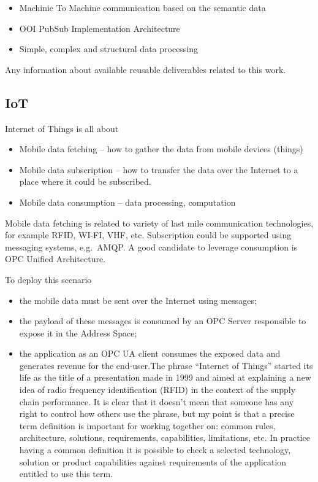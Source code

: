 \documentclass[
]{article}
\providecommand{\tightlist}{%
  \setlength{\itemsep}{0pt}\setlength{\parskip}{0pt}}
\begin{document}
\begin{itemize}
\tightlist
\item
  Machinie To Machine communication based on the semantic data
\item
  OOI PubSub Implementation Architecture
\item
  Simple, complex and structural data processing
\end{itemize}

Any information about available reusable deliverables related to this
work.

\hypertarget{iot}{%
\subsection{IoT}\label{iot}}

Internet of Things is all about

\begin{itemize}
\tightlist
\item
  Mobile data fetching -- how to gather the data from mobile devices
  (things)
\item
  Mobile data subscription -- how to transfer the data over the Internet
  to a place where it could be subscribed.
\item
  Mobile data consumption -- data processing, computation
\end{itemize}

Mobile data fetching is related to variety of last mile communication
technologies, for example RFID, WI-FI, VHF, etc. Subscription could be
supported using messaging systems, e.g.~AMQP. A good candidate to
leverage consumption is OPC Unified Architecture.

To deploy this scenario

\begin{itemize}
\tightlist
\item
  the mobile data must be sent over the Internet using messages;
\item
  the payload of these messages is consumed by an OPC Server responsible
  to expose it in the Address Space;
\item
  the application as an OPC UA client consumes the exposed data and
  generates revenue for the end-user.The phrase ``Internet of Things''
  started its life as the title of a presentation made in 1999 and aimed
  at explaining a new idea of radio frequency identification (RFID) in
  the context of the supply chain performance. It is clear that it
  doesn't mean that someone has any right to control how others use the
  phrase, but my point is that a precise term definition is important
  for working together on: common rules, architecture, solutions,
  requirements, capabilities, limitations, etc. In practice having a
  common definition it is possible to check a selected technology,
  solution or product capabilities against requirements of the
  application entitled to use this term.
\end{itemize}
\end{document}

